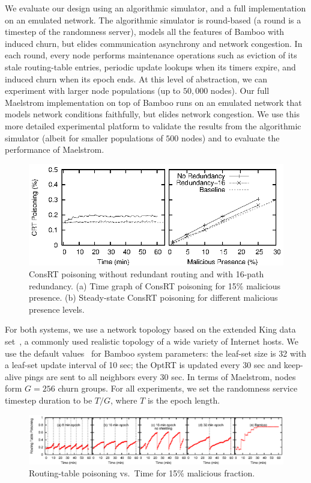\documentclass[10pt,twocolumn]{article}
\newcommand{\PRT}{OptRT\xspace}
\newcommand{\CRT}{ConsRT\xspace}
\begin{document}
We evaluate our design using an algorithmic simulator, and a full
implementation on an emulated network.  The algorithmic simulator is
round-based (a round is a timestep of the randomness server), models
all the features of Bamboo with induced churn, but elides communication asynchrony and
network congestion. 
In each round, every node performs maintenance
operations such as eviction of its stale routing-table entries, periodic
update lookups when its timers expire, and induced churn when its epoch
ends.  At this level of abstraction, we can experiment with larger
node populations (up to $50,000$ nodes).
Our full Maelstrom implementation on top of Bamboo runs on
an emulated network that models
network conditions faithfully, but elides network congestion.  We use
this more detailed experimental platform to validate the results from
the algorithmic simulator (albeit for smaller populations of $500$
nodes) and to evaluate the performance of Maelstrom.
\begin{figure}
\centerline{\includegraphics{graphs/crtPoisoning}}
\caption{\CRT poisoning without redundant routing and with
  16-path redundancy.  (a) Time graph of \CRT poisoning for 15\% malicious
  presence.  (b) Steady-state \CRT poisoning for different malicious
  presence levels.}
\label{fig:crtPoisoning}
\end{figure}


For both systems, we use a network topology based on the extended King
data set~\cite{King2002}, a commonly used realistic topology of a wide
variety of Internet
hosts.  We use the default values~\cite{Rhea2004} for Bamboo 
system parameters: the leaf-set size is 32 with a leaf-set update
interval of 10 sec; the \PRT is updated every 30 sec and keep-alive
pings are sent to all neighbors every 30 sec.  In terms of Maelstrom, nodes form $G=256$ churn
groups.  For all experiments, we set the randomness service timestep
duration to be $T/G$, where $T$ is the epoch length.

\begin{figure}
\begin{center}
\centerline{\includegraphics{graphs/timeGraph.eps}}
\caption{Routing-table poisoning vs.\ Time for 15\% malicious
fraction.}
\label{fig:timeGraph}
\end{center}
\end{figure}
\end{document}
